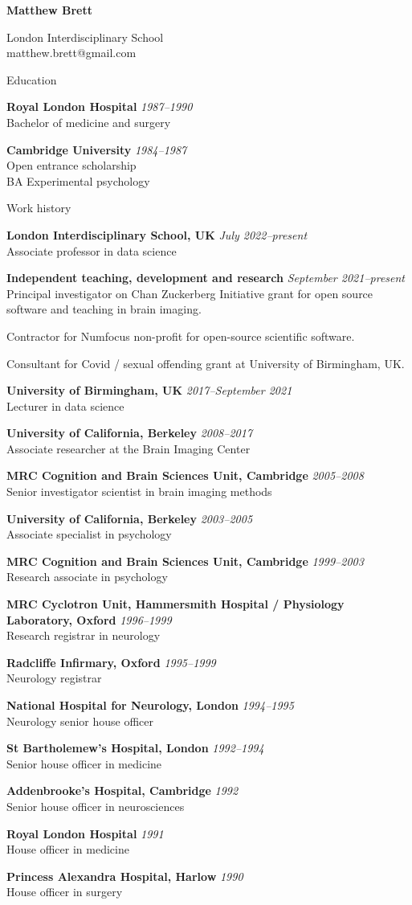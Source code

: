 \documentclass{cv}
\newcommand{\PlaceDate}[2]{{\bf #1} \hfill {\em #2} \\}
\newcommand{\PlaceDateNote}[3]{{\bf #1} \hfill {\em #2} \\#3}
\newcommand{\LIS}{London Interdisciplinary School, UK}
\newcommand{\UoB}{University of Birmingham, UK}
\newcommand{\UCB}{University of California, Berkeley}
\newcommand{\CBU}{MRC Cognition and Brain Sciences Unit, Cambridge}
\begin{document}
\nocite{*}

{\huge \bf Matthew Brett}

London Interdisciplinary School \\
matthew.brett@gmail.com

\begin{cvSection}{Education}

\PlaceDate{Royal London Hospital}{1987--1990 }
Bachelor of medicine and surgery

\PlaceDateNote{Cambridge University}{1984--1987 }{
Open entrance scholarship \\
BA Experimental psychology}

\end{cvSection}

\begin{cvSection}{Work history}

\PlaceDateNote{\LIS}{July 2022--present }{
    Associate professor in data science}

\PlaceDateNote{Independent teaching, development and research}{September 2021--present}{
    Principal investigator on Chan Zuckerberg Initiative grant for open source software and teaching in brain imaging.

    Contractor for Numfocus non-profit for open-source scientific software.

    Consultant for Covid / sexual offending grant at \UoB.}

\PlaceDateNote{\UoB}{2017--September 2021 }{
    Lecturer in data science}

\PlaceDateNote{\UCB}{2008--2017 }{
    Associate researcher at the Brain Imaging Center}

\PlaceDateNote{\CBU}{2005--2008}{
    Senior investigator scientist in brain imaging methods}

\PlaceDateNote{\UCB}{2003--2005 }{
    Associate specialist in psychology}

\PlaceDateNote{\CBU}{1999--2003 }{
    Research associate in psychology}

\PlaceDateNote{
MRC Cyclotron Unit, Hammersmith Hospital / Physiology Laboratory, Oxford}
{1996--1999}
{Research registrar in neurology}

\PlaceDateNote{Radcliffe Infirmary, Oxford}
{1995--1999}
{Neurology registrar}

\PlaceDateNote{National Hospital for Neurology, London}{1994--1995 }{
Neurology senior house officer}

\PlaceDateNote{St Bartholemew's Hospital, London}{1992--1994 }{
Senior house officer in medicine}

\PlaceDateNote{Addenbrooke's Hospital, Cambridge}{1992 }{
Senior house officer in neurosciences}

\PlaceDateNote{Royal London Hospital}{1991 }{
House officer in medicine}

\PlaceDateNote{Princess Alexandra Hospital, Harlow}{1990 }{
House officer in surgery}

\end{cvSection}
\end{document}
